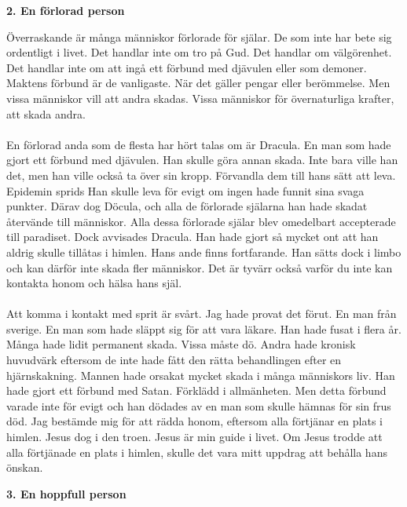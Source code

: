\documentclass[]{article}
\begin{document}
\begin{center}
	\large\textbf{2. En förlorad person}
\end{center}

Överraskande är många människor förlorade för själar. De som inte har bete sig ordentligt i livet. Det handlar inte om tro på Gud. Det handlar om välgörenhet. Det handlar inte om att ingå ett förbund med djävulen eller som demoner. Maktens förbund är de vanligaste. När det gäller pengar eller berömmelse. Men vissa människor vill att andra skadas. Vissa människor för övernaturliga krafter, att skada andra.
\\ \\
En förlorad anda som de flesta har hört talas om är Dracula. En man som hade gjort ett förbund med djävulen. Han skulle göra annan skada. Inte bara ville han det, men han ville också ta över sin kropp. Förvandla dem till hans sätt att leva. Epidemin sprids Han skulle leva för evigt om ingen hade funnit sina svaga punkter. Därav dog Döcula, och alla de förlorade själarna han hade skadat återvände till människor. Alla dessa förlorade själar blev omedelbart accepterade till paradiset. Dock avvisades Dracula. Han hade gjort så mycket ont att han aldrig skulle tillåtas i himlen. Hans ande finns fortfarande. Han sätts dock i limbo och kan därför inte skada fler människor. Det är tyvärr också varför du inte kan kontakta honom och hälsa hans själ.
\\ \\
Att komma i kontakt med sprit är svårt. Jag hade provat det förut. En man från sverige. En man som hade släppt sig för att vara läkare. Han hade fusat i flera år. Många hade lidit permanent skada. Vissa måste dö. Andra hade kronisk huvudvärk eftersom de inte hade fått den rätta behandlingen efter en hjärnskakning. Mannen hade orsakat mycket skada i många människors liv. Han hade gjort ett förbund med Satan. Förklädd i allmänheten. Men detta förbund varade inte för evigt och han dödades av en man som skulle hämnas för sin frus död. Jag bestämde mig för att rädda honom, eftersom alla förtjänar en plats i himlen. Jesus dog i den troen. Jesus är min guide i livet. Om Jesus trodde att alla förtjänade en plats i himlen, skulle det vara mitt uppdrag att behålla hans önskan.

\begin{center}
	\large\textbf{3. En hoppfull person}
\end{center}
\end{document}
